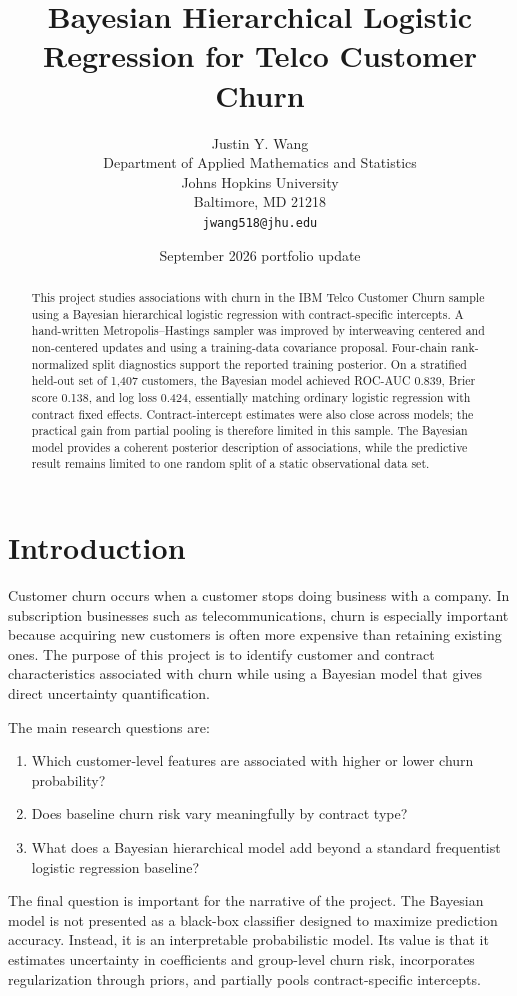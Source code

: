 \documentclass{article}
\title{Bayesian Hierarchical Logistic Regression for Telco Customer Churn}
\date{September 2026 portfolio update}
\author{%
  Justin Y. Wang\\
  Department of Applied Mathematics and Statistics\\
  Johns Hopkins University\\
  Baltimore, MD 21218\\
  \texttt{jwang518@jhu.edu}
}
\begin{document}
\maketitle

\begin{abstract}
This project studies associations with churn in the IBM Telco Customer Churn sample using a Bayesian hierarchical logistic regression with contract-specific intercepts. A hand-written Metropolis--Hastings sampler was improved by interweaving centered and non-centered updates and using a training-data covariance proposal. Four-chain rank-normalized split diagnostics support the reported training posterior. On a stratified held-out set of 1,407 customers, the Bayesian model achieved ROC-AUC 0.839, Brier score 0.138, and log loss 0.424, essentially matching ordinary logistic regression with contract fixed effects. Contract-intercept estimates were also close across models; the practical gain from partial pooling is therefore limited in this sample. The Bayesian model provides a coherent posterior description of associations, while the predictive result remains limited to one random split of a static observational data set.
\end{abstract}

\section{Introduction}

Customer churn occurs when a customer stops doing business with a company. In subscription businesses such as telecommunications, churn is especially important because acquiring new customers is often more expensive than retaining existing ones. The purpose of this project is to identify customer and contract characteristics associated with churn while using a Bayesian model that gives direct uncertainty quantification.

The main research questions are:
\begin{enumerate}
  \item Which customer-level features are associated with higher or lower churn probability?
  \item Does baseline churn risk vary meaningfully by contract type?
  \item What does a Bayesian hierarchical model add beyond a standard frequentist logistic regression baseline?
\end{enumerate}

The final question is important for the narrative of the project. The Bayesian model is not presented as a black-box classifier designed to maximize prediction accuracy. Instead, it is an interpretable probabilistic model. Its value is that it estimates uncertainty in coefficients and group-level churn risk, incorporates regularization through priors, and partially pools contract-specific intercepts.
\end{document}
